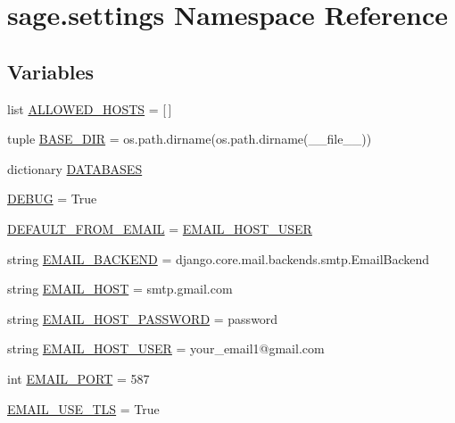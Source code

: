 \hypertarget{a00043}{}\section{sage.\+settings Namespace Reference}
\label{a00043}
\subsection*{Variables}
\begin{DoxyCompactItemize}
\item 
list \hyperlink{a00043_a2eb98def792cf73bbc5884024afc5602}{A\+L\+L\+O\+W\+E\+D\+\_\+\+H\+O\+S\+T\+S} = \mbox{[}$\,$\mbox{]}
\item 
tuple \hyperlink{a00043_add6d83672b1137d74a06bf1606aecf04}{B\+A\+S\+E\+\_\+\+D\+I\+R} = os.\+path.\+dirname(os.\+path.\+dirname(\+\_\+\+\_\+file\+\_\+\+\_\+))
\item 
dictionary \hyperlink{a00043_a870c10acdd1141ac92340ce3e50ffbbd}{D\+A\+T\+A\+B\+A\+S\+E\+S}
\item 
\hyperlink{a00043_acc28086c56df6aed910b2552e07944cc}{D\+E\+B\+U\+G} = True
\item 
\hyperlink{a00043_a6517c4f93850d63e2bdbe7040ad0e2ff}{D\+E\+F\+A\+U\+L\+T\+\_\+\+F\+R\+O\+M\+\_\+\+E\+M\+A\+I\+L} = \hyperlink{a00043_a9c01855359753a3c3f517341806347c2}{E\+M\+A\+I\+L\+\_\+\+H\+O\+S\+T\+\_\+\+U\+S\+E\+R}
\item 
string \hyperlink{a00043_a2d83ca0a279480aa03599465a0386b17}{E\+M\+A\+I\+L\+\_\+\+B\+A\+C\+K\+E\+N\+D} = \textquotesingle{}django.\+core.\+mail.\+backends.\+smtp.\+Email\+Backend\textquotesingle{}
\item 
string \hyperlink{a00043_a594329fe15c9680f523afaab779411ed}{E\+M\+A\+I\+L\+\_\+\+H\+O\+S\+T} = \textquotesingle{}smtp.\+gmail.\+com\textquotesingle{}
\item 
string \hyperlink{a00043_a66e7a16ed6b0df5716a6579fcba949a6}{E\+M\+A\+I\+L\+\_\+\+H\+O\+S\+T\+\_\+\+P\+A\+S\+S\+W\+O\+R\+D} = \textquotesingle{}password\textquotesingle{}
\item 
string \hyperlink{a00043_a9c01855359753a3c3f517341806347c2}{E\+M\+A\+I\+L\+\_\+\+H\+O\+S\+T\+\_\+\+U\+S\+E\+R} = \textquotesingle{}your\+\_\+email1@gmail.\+com\textquotesingle{}
\item 
int \hyperlink{a00043_a3fe927460bba6408b5df39fa8a10d367}{E\+M\+A\+I\+L\+\_\+\+P\+O\+R\+T} = 587
\item 
\hyperlink{a00043_a0fe7c4174cb1b7d03f7b574ae1e5eed9}{E\+M\+A\+I\+L\+\_\+\+U\+S\+E\+\_\+\+T\+L\+S} = True

\end{DoxyCompactItemize}
